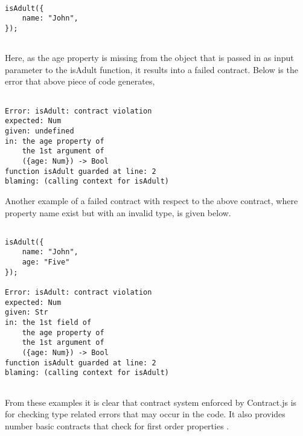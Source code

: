 \begin{minipage}{\linewidth}
\lstset{language=Java, caption=Example of a failed contract, captionpos=b}       
\begin{lstlisting}[frame=single]

isAdult({
    name: "John",
});
    
\end{lstlisting}
\end{minipage}

Here, as the age property is missing from the object that is passed in as input parameter to the isAdult function, it results into a failed contract. Below is the error that above piece of code generates,
\linebreak

\begin{minipage}{\linewidth}
\lstset{language=Java, caption=Error message on failed contract, captionpos=b, breaklines=true}       
\begin{lstlisting}[frame=single]

Error: isAdult: contract violation
expected: Num
given: undefined
in: the age property of
    the 1st argument of
    ({age: Num}) -> Bool
function isAdult guarded at line: 2
blaming: (calling context for isAdult)

\end{lstlisting}
\end{minipage}


\begin{minipage}{\linewidth}
Another example of a failed contract with respect to the above contract, where property name exist but with an invalid type, is given below.

\lstset{language=Java, caption=Example of a failed contract, captionpos=b, breaklines=true}       
\begin{lstlisting}[frame=single]

isAdult({
    name: "John",
    age: "Five"
});

Error: isAdult: contract violation
expected: Num
given: Str
in: the 1st field of
    the age property of
    the 1st argument of
    ({age: Num}) -> Bool
function isAdult guarded at line: 2
blaming: (calling context for isAdult)
    
\end{lstlisting}
\end{minipage}

From these examples it is clear that contract system enforced by Contract.js is for checking type related errors that may occur in the code. It also provides number basic contracts that check for first order properties \cite{Contract11:online}.    

